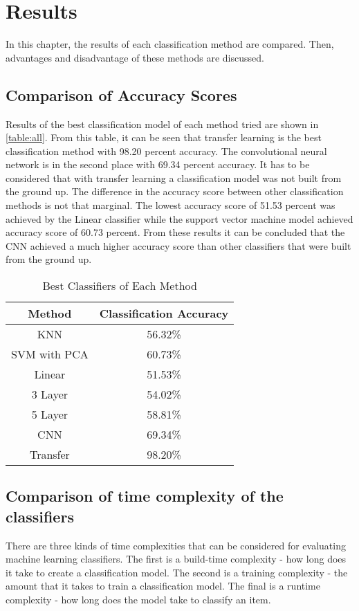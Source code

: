 
\chapter{Results}
In this chapter, the results of each classification method are compared. Then, advantages and disadvantage of these methods are discussed.

\section{Comparison of Accuracy Scores}

Results of the best classification model of each method tried are shown in  \autoref{table:all}. From this table, it can be seen that transfer learning is the best classification method with 98.20 percent accuracy. The convolutional neural network is in the second place with 69.34 percent accuracy. It has to be considered that with transfer learning a classification model was not built from the ground up. The difference in the  accuracy score between other classification methods is not that marginal. The lowest accuracy score of 51.53 percent was achieved by the Linear classifier while the support vector machine model achieved accuracy score of 60.73 percent.  From these results it can be concluded that the CNN achieved a much higher accuracy score than other classifiers that were built from the ground up.

\begin{table}[h]
\begin{center}
\begin{tabular}{ |c|c| } 
 \hline
Method &  Classification Accuracy \\   \hline
KNN    &  56.32\% \\
SVM with PCA   & 60.73\% \\
Linear   &    51.53\%  \\
3 Layer    &   54.02\% \\
5 Layer    &  58.81\% \\
CNN & 69.34\% \\
Transfer  &  98.20\% \\

 \hline
\end{tabular}
\caption{Best Classifiers of Each Method}
\label{table:all}
\end{center}
\end{table}


\section{Comparison  of time complexity of the classifiers}
There are three kinds of time complexities that can be considered for evaluating machine learning classifiers. The first  is a build-time complexity - how long does it take to create a classification model. The second  is a training complexity - the amount that it takes to train a classification model. The final  is a runtime complexity - how long does the model take to classify an item. 

